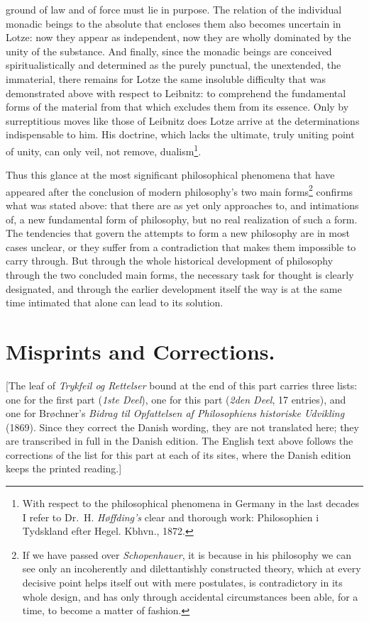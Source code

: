 ground of law and of force must lie in purpose. The relation of the
individual monadic beings to the absolute that encloses them also
becomes uncertain in Lotze: now they appear as independent, now they
are wholly dominated by the unity of the substance. And finally, since
the monadic beings are conceived spiritualistically and determined as
the purely punctual, the unextended, the immaterial, there remains for
Lotze the same insoluble difficulty that was demonstrated above with
respect to Leibnitz: to comprehend the fundamental forms of the
material from that which excludes them from its essence. Only by
surreptitious moves like those of Leibnitz does Lotze arrive at the
determinations indispensable to him. His doctrine, which lacks the
ultimate, truly uniting point of unity, can only veil, not remove,
dualism\footnote{
With respect to the philosophical phenomena in Germany in the last
decades I refer to Dr.\ H. \emph{Høffding's} clear and thorough work:
Philosophien i Tydskland efter Hegel. Kbhvn., 1872.}.

Thus this glance at the most significant philosophical phenomena that
have appeared after the conclusion of modern philosophy's two main
forms\footnote{
If we have passed over \emph{Schopenhauer}, it is because in his
philosophy we can see only an incoherently and dilettantishly
constructed theory, which at every decisive point helps itself out with
mere postulates, is contradictory in its whole design, and has only
through accidental circumstances been able, for a time, to become a
matter of fashion.} confirms what was stated above: that there are as
yet only approaches to, and intimations of, a new
fundamental form of philosophy, but no real realization of
such a form. The tendencies that govern the attempts to form a new
philosophy are in most cases unclear, or they suffer from a
contradiction that makes them impossible to carry through. But through
the whole historical development of philosophy through the two
concluded main forms, the necessary task for thought is clearly
designated, and through the earlier development itself the way is at
the same time intimated that alone can lead to its solution.

\dblrule


\chapter*{Misprints and Corrections.}

[The leaf of \emph{Trykfeil og Rettelser} bound at the end of this part
carries three lists: one for the first part (\emph{1ste Deel}), one for
this part (\emph{2den Deel}, 17 entries), and one for Brøchner's
\emph{Bidrag til Opfattelsen af Philosophiens historiske Udvikling}
(1869).  Since they correct the Danish wording, they are not translated
here; they are transcribed in full in the Danish edition.  The English
text above follows the corrections of the list for this part at each of
its sites, where the Danish edition keeps the printed reading.]


